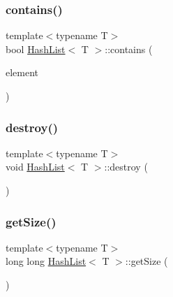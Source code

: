 \mbox{\label{classHashList_af90d56617f493f45f687c461232b1cf7}} 
\subsubsection{\texorpdfstring{contains()}{contains()}}
{\footnotesize\ttfamily template$<$typename T$>$ \\
bool \hyperlink{classHashList}{Hash\+List}$<$ T $>$\+::contains (\begin{DoxyParamCaption}\item[{const T \&}]{element }\end{DoxyParamCaption})\hspace{0.3cm}{\ttfamily [inline]}}

\mbox{\label{classHashList_a14a376c11ebe03a832d62ecf91c10560}} 
\subsubsection{\texorpdfstring{destroy()}{destroy()}}
{\footnotesize\ttfamily template$<$typename T$>$ \\
void \hyperlink{classHashList}{Hash\+List}$<$ T $>$\+::destroy (\begin{DoxyParamCaption}{ }\end{DoxyParamCaption})\hspace{0.3cm}{\ttfamily [inline]}}

\mbox{\label{classHashList_a94a4649ef9bdf27ccac0f6fc6da95334}} 
\subsubsection{\texorpdfstring{get\+Size()}{getSize()}}
{\footnotesize\ttfamily template$<$typename T$>$ \\
long long \hyperlink{classHashList}{Hash\+List}$<$ T $>$\+::get\+Size (\begin{DoxyParamCaption}{ }\end{DoxyParamCaption})\hspace{0.3cm}{\ttfamily [inline]}}

